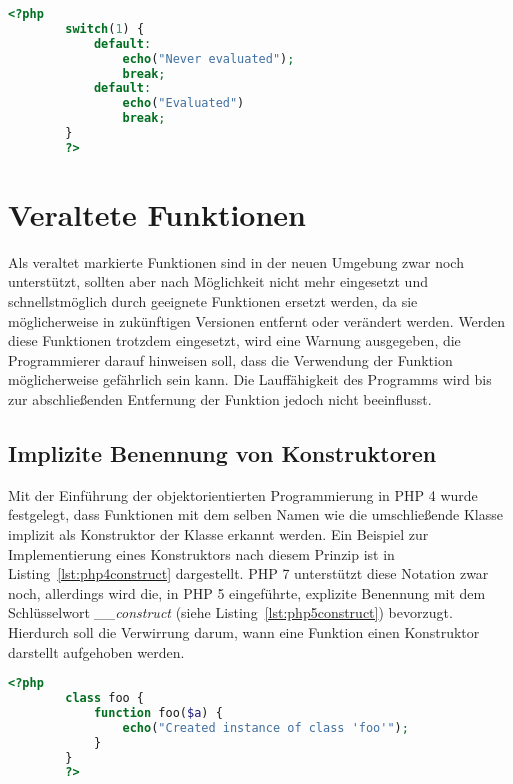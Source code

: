     \begin{lstlisting}[language=php, caption={Beispiel meherer default-Blöcke in Switch-Anweisungen}, label={lst:php5switch}]
        <?php
        switch(1) {
            default:
                echo("Never evaluated");
                break;
            default:
                echo("Evaluated")
                break;
        }
        ?>
    \end{lstlisting}


\section{Veraltete Funktionen}
Als veraltet markierte Funktionen sind in der neuen Umgebung zwar noch unterstützt, sollten aber nach Möglichkeit nicht mehr eingesetzt und schnellstmöglich durch geeignete 
Funktionen ersetzt werden, da sie möglicherweise in zukünftigen Versionen entfernt oder verändert werden. Werden diese Funktionen trotzdem eingesetzt, wird eine Warnung 
ausgegeben, die Programmierer darauf hinweisen soll, dass die Verwendung der Funktion möglicherweise gefährlich sein kann. Die Lauffähigkeit des Programms wird bis zur 
abschließenden Entfernung der Funktion jedoch nicht beeinflusst. \cite{oracle_how_2004}
    \subsection{Implizite Benennung von Konstruktoren}\label{php5implicit}
    Mit der Einführung der objektorientierten Programmierung in PHP 4 wurde festgelegt, dass Funktionen mit dem selben Namen wie die umschließende Klasse implizit als 
    Konstruktor der Klasse erkannt werden. Ein Beispiel zur Implementierung eines Konstruktors nach diesem Prinzip ist in Listing~\ref{lst:php4construct} dargestellt.
    PHP 7 unterstützt diese Notation zwar noch, allerdings wird die, in PHP 5 eingeführte, explizite Benennung mit dem Schlüsselwort \textit{\_\_construct} (siehe 
    Listing~\ref{lst:php5construct}) bevorzugt. Hierdurch soll die Verwirrung darum, wann eine Funktion einen Konstruktor darstellt aufgehoben werden. \cite{morrison_php:_2014}
    \begin{lstlisting}[language=php, caption={Beispiel eines impliziten Konstruktors}, label={lst:php4construct}]
        <?php
        class foo {
            function foo($a) {
                echo("Created instance of class 'foo'");
            }
        }
        ?>
    \end{lstlisting}

